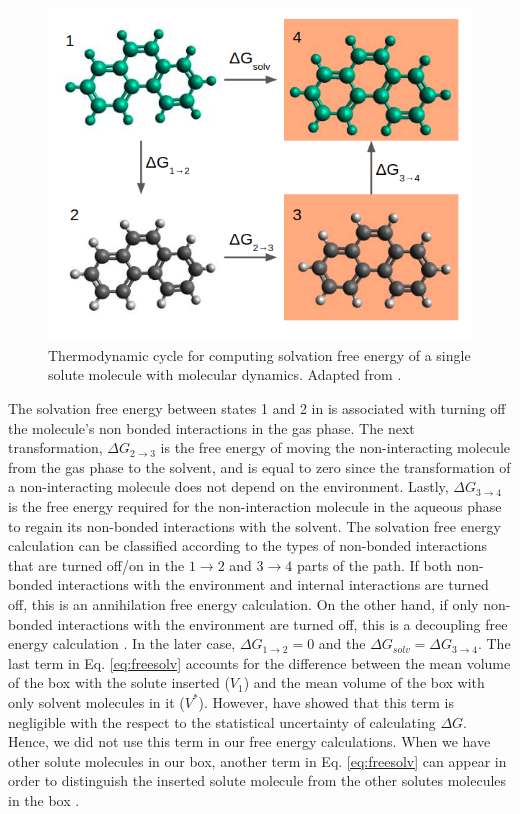 	\begin{figure}[th]
		\centering
		\includegraphics[scale=0.6]{Figures/cicclotermo}
		\caption{Thermodynamic cycle for computing solvation free energy of a single solute molecule with molecular dynamics. Adapted from .}
		\label{thermcy}
	\end{figure}
	
	The solvation free energy between states 1 and 2 in  is associated with turning off the molecule's non bonded interactions in the gas phase. The next transformation, $\Delta G_{2 \rightarrow 3}$ is the free energy of moving the non-interacting molecule from the gas phase to the solvent, and is equal to zero since the transformation of a non-interacting molecule does not depend on the environment. Lastly, $\Delta G_{3 \rightarrow 4}$ is the free energy required for the non-interaction molecule in the aqueous phase to regain its non-bonded interactions with the solvent.  The solvation free energy calculation can be classified according to the types of non-bonded interactions that are turned off/on in the $1 \rightarrow 2$ and $ 3 \rightarrow 4$ parts of the path. If both non-bonded interactions with the environment and internal interactions are turned off, this is an annihilation free energy calculation. On the other hand, if only non-bonded interactions with the environment are turned off, this is a decoupling free energy calculation \cite{klimovich}. In the later case, $\Delta G_{1 \rightarrow 2} = 0$ and the $\Delta G_{solv} = \Delta G_{3 \rightarrow 4} $. The last term in Eq. \ref{eq:freesolv} accounts for the difference between the mean volume of the box with the solute inserted ($V_{1}$) and the mean volume of the box with only solvent molecules in it ($V^{*}$). However,  have showed that this term is negligible with the respect to the statistical uncertainty of calculating $\Delta G$. Hence, we did not use this term in our free energy calculations. When we have other solute molecules in our box, another term in Eq. \ref{eq:freesolv} can appear in order to distinguish the inserted solute molecule from the other solutes molecules in the box \cite{perguntar}. 
	

